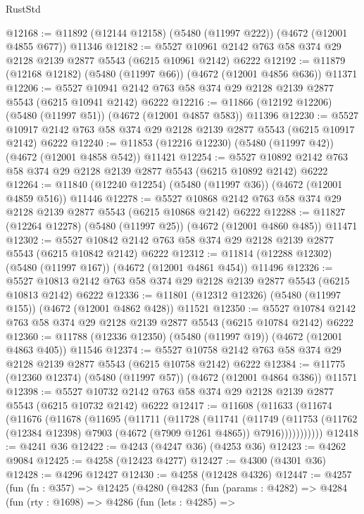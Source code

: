 \begin{lexlean}{RustStd}
\begin{coremodule}
@12168 := @11892 (@12144 @12158) (@5480 (@11997 @222)) (@4672 (@12001 @4855 @677)) @11346
@12182 := @5527 @10961 @2142 @763 @58 @374 @29 @2128 @2139 @2877 @5543 (@6215 @10961 @2142) @6222
@12192 := @11879 (@12168 @12182) (@5480 (@11997 @66)) (@4672 (@12001 @4856 @636)) @11371
@12206 := @5527 @10941 @2142 @763 @58 @374 @29 @2128 @2139 @2877 @5543 (@6215 @10941 @2142) @6222
@12216 := @11866 (@12192 @12206) (@5480 (@11997 @51)) (@4672 (@12001 @4857 @583)) @11396
@12230 := @5527 @10917 @2142 @763 @58 @374 @29 @2128 @2139 @2877 @5543 (@6215 @10917 @2142) @6222
@12240 := @11853 (@12216 @12230) (@5480 (@11997 @42)) (@4672 (@12001 @4858 @542)) @11421
@12254 := @5527 @10892 @2142 @763 @58 @374 @29 @2128 @2139 @2877 @5543 (@6215 @10892 @2142) @6222
@12264 := @11840 (@12240 @12254) (@5480 (@11997 @36)) (@4672 (@12001 @4859 @516)) @11446
@12278 := @5527 @10868 @2142 @763 @58 @374 @29 @2128 @2139 @2877 @5543 (@6215 @10868 @2142) @6222
@12288 := @11827 (@12264 @12278) (@5480 (@11997 @25)) (@4672 (@12001 @4860 @485)) @11471
@12302 := @5527 @10842 @2142 @763 @58 @374 @29 @2128 @2139 @2877 @5543 (@6215 @10842 @2142) @6222
@12312 := @11814 (@12288 @12302) (@5480 (@11997 @167)) (@4672 (@12001 @4861 @454)) @11496
@12326 := @5527 @10813 @2142 @763 @58 @374 @29 @2128 @2139 @2877 @5543 (@6215 @10813 @2142) @6222
@12336 := @11801 (@12312 @12326) (@5480 (@11997 @155)) (@4672 (@12001 @4862 @428)) @11521
@12350 := @5527 @10784 @2142 @763 @58 @374 @29 @2128 @2139 @2877 @5543 (@6215 @10784 @2142) @6222
@12360 := @11788 (@12336 @12350) (@5480 (@11997 @19)) (@4672 (@12001 @4863 @405)) @11546
@12374 := @5527 @10758 @2142 @763 @58 @374 @29 @2128 @2139 @2877 @5543 (@6215 @10758 @2142) @6222
@12384 := @11775 (@12360 @12374) (@5480 (@11997 @57)) (@4672 (@12001 @4864 @386)) @11571
@12398 := @5527 @10732 @2142 @763 @58 @374 @29 @2128 @2139 @2877 @5543 (@6215 @10732 @2142) @6222
@12417 := @11608
    (@11633
      (@11674
        (@11676
          (@11678
            (@11695
              (@11711
                (@11728
                  (@11741
                    (@11749
                      (@11753
                        (@11762 (@12384 @12398) @7903 (@4672 (@7909 @1261 @4865)) @7916)))))))))))
@12418 := @4241 @36
@12422 := @4243 (@4247 @36) (@4253 @36)
@12423 := @4262 @9084
@12425 := @4258 (@12423 @4277)
@12427 := @4300 (@4301 @36)
@12428 := @4296 @12427
@12430 := @4258 (@12428 @4326)
@12447 := @4257
    (fun (fn : @357) =>
    @12425
      (@4280
        (@4283
          (fun (params : @4282) =>
          @4284
            (fun (rty : @1698) =>
            @4286
              (fun (lets : @4285) =>

\end{coremodule}
\end{lexlean}
